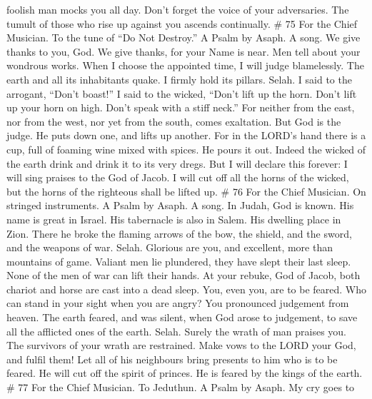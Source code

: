 foolish man mocks you all day.  Don't forget the voice of
your adversaries. The tumult of those who rise up against you ascends
continually. \# 75 For the Chief Musician. To the tune of ``Do Not
Destroy.'' A Psalm by Asaph. A song.  We give thanks to
you, God. We give thanks, for your Name is near. Men tell about your
wondrous works.  When I choose the appointed time, I will
judge blamelessly.  The earth and all its inhabitants
quake. I firmly hold its pillars. Selah.  I said to the
arrogant, ``Don't boast!'' I said to the wicked, ``Don't lift up the
horn.  Don't lift up your horn on high. Don't speak with a
stiff neck.''  For neither from the east, nor from the
west, nor yet from the south, comes exaltation.  But God
is the judge. He puts down one, and lifts up another.  For
in the LORD's hand there is a cup, full of foaming wine mixed with
spices. He pours it out. Indeed the wicked of the earth drink and drink
it to its very dregs.  But I will declare this forever: I
will sing praises to the God of Jacob.  I will cut off
all the horns of the wicked, but the horns of the righteous shall be
lifted up. \# 76 For the Chief Musician. On stringed instruments. A
Psalm by Asaph. A song.  In Judah, God is known. His name
is great in Israel.  His tabernacle is also in Salem. His
dwelling place in Zion.  There he broke the flaming arrows
of the bow, the shield, and the sword, and the weapons of war. Selah.
 Glorious are you, and excellent, more than mountains of
game.  Valiant men lie plundered, they have slept their
last sleep. None of the men of war can lift their hands. 
At your rebuke, God of Jacob, both chariot and horse are cast into a
dead sleep.  You, even you, are to be feared. Who can
stand in your sight when you are angry?  You pronounced
judgement from heaven. The earth feared, and was silent, 
when God arose to judgement, to save all the afflicted ones of the
earth. Selah.  Surely the wrath of man praises you. The
survivors of your wrath are restrained.  Make vows to the
LORD your God, and fulfil them! Let all of his neighbours bring presents
to him who is to be feared.  He will cut off the spirit
of princes. He is feared by the kings of the earth. \# 77 For the Chief
Musician. To Jeduthun. A Psalm by Asaph.  My cry goes to
